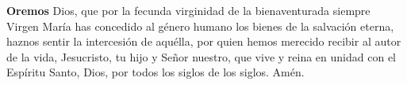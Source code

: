 \textbf{Oremos}
Dios, que por la fecunda virginidad de la bienaventurada siempre Virgen María has concedido al género humano los bienes de la salvación eterna, haznos sentir
la intercesión de aquélla, por quien hemos merecido recibir al autor de la vida, Jesucristo, tu hijo y Señor nuestro, que vive y reina en unidad con el Espíritu Santo, Dios, por
todos los siglos de los siglos. Amén.